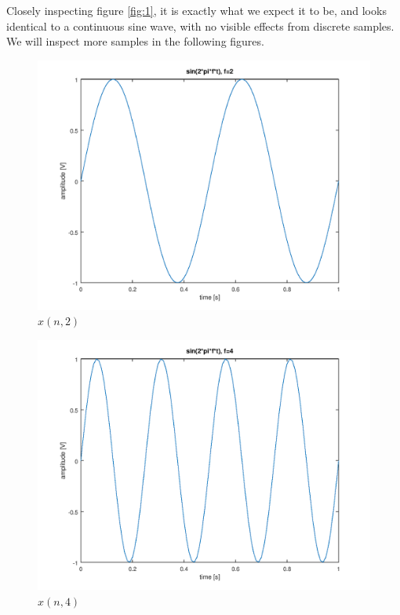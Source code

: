 \documentclass[a4paper, 12pt]{report}
\begin{document}
			Closely inspecting figure \ref{fig:1}, it is exactly what we expect it to be, and looks identical to a continuous sine wave, with no visible effects from discrete samples. We will inspect more samples in the following figures.

			\begin{figure}[H]
				\includegraphics[width=\textwidth]{img/1_2.png}
				\caption{$x(n, 2)$}
				\label{fig:2}
			\end{figure}

			\begin{figure}[H]
				\includegraphics[width=\textwidth]{img/1_3.png}
				\caption{$x(n, 4)$}
				\label{fig:3}
			\end{figure}
\end{document}
